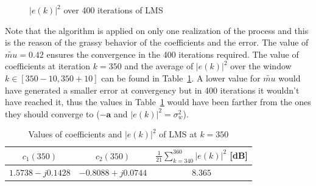 \documentclass[10pt]{article}
\numberwithin{equation}{section}
\begin{document}
\begin{figure}[h!]

  \caption{$|e(k)|^2$ over 400 iterations of LMS}
  \label{fig:err_lms}
\end{figure}

Note that the algorithm is applied on only one realization of the process and this is the reason of the grassy behavior of the coefficients and the error. The value of $\tilde{mu} = 0.42$ ensures the convergence in the 400 iterations required. The value of coefficients at iteration $k = 350$ and the average of $|e(k)|^2$ over the window $k \in [350 - 10, 350 + 10]$ can be found in Table~\ref{table:lms_conv}. A lower value for $\tilde{mu}$ would have generated a smaller error at convergency but in 400 iterations it wouldn't have reached it, thus the values in Table~\ref{table:lms_conv} would have been farther from the ones they should converge to ($-\mathbf{a}$ and $|e(k)|^2 = \sigma_w^2$).
\begin{table}[h!]
  \centering
  \begin{tabular}{c|c|c}
    $c_1(350)$ &   $c_2(350)$ & $\frac{1}{21}\sum_{k=340}^{360} |e(k)|^2$ [dB] \\ \hline
    $1.5738 - j0.1428$ & $-0.8088 + j0.0744$ & $8.365$
  \end{tabular}
  \caption{Values of coefficients and $|e(k)|^2$ of LMS at $k=350$}
  \label{table:lms_conv}
\end{table}
\end{document}
